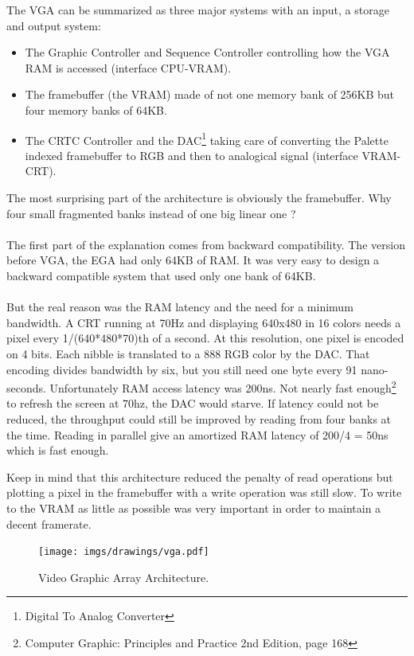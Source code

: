 \documentclass[book.tex]{subfiles}
\begin{document}
The VGA can be summarized as three major systems with an input, a storage and output system:\\

\begin{itemize}
\item The Graphic Controller and Sequence Controller controlling how the VGA RAM is accessed (interface CPU-VRAM).
\item The framebuffer (the VRAM) made of not one memory bank of 256KB but four memory banks of 64KB.
\item The CRTC Controller and the DAC\footnote{Digital To Analog Converter} taking care of converting the Palette indexed framebuffer to RGB and then to analogical signal (interface VRAM-CRT).
\end{itemize}

The most surprising part of the architecture is obviously the framebuffer. Why four small fragmented banks instead of one big linear one ?\\
\\
The first part of the explanation comes from backward compatibility. The version before VGA, the EGA had only 64KB of RAM. It was very easy to design a backward compatible system that used only one bank of 64KB.\\
\\
But the real reason was the RAM latency and the need for a minimum bandwidth. A CRT running at 70Hz and displaying 640x480 in 16 colors needs a pixel every 1/(640*480*70)th of a second. At this resolution, one pixel is encoded on 4 bits. Each nibble is translated to a 888 RGB color by the DAC. That encoding divides bandwidth by six, but you still need one byte every 91 nano-seconds. Unfortunately RAM access latency was 200ns. Not nearly fast enough\footnote{Computer Graphic: Principles and Practice 2nd Edition, page 168} to refresh the screen at 70hz, the DAC would starve. If latency could not be reduced, the throughput could still be improved by reading from four banks at the time. Reading in parallel give an amortized RAM latency of 200/4 = 50ns which is fast enough.\\
\par
Keep in mind that this architecture reduced the penalty of read operations but plotting a pixel in the framebuffer with a write operation was still slow. To write to the VRAM as little as possible was very important in order to maintain a decent framerate. 


\begin{figure}[H]
\centering
\texttt{[image: imgs/drawings/vga.pdf]}
\caption{Video Graphic Array Architecture.}
\label{fig:vga_arch}
\end{figure}
\end{document}
